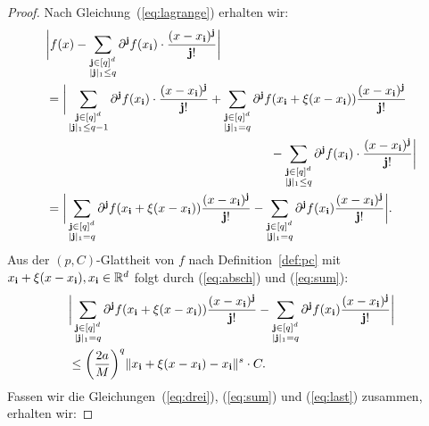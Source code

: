 \begin{proof}
Nach Gleichung~(\ref{eq:lagrange}) erhalten wir:
\begin{equation}
\label{eq:sum}
\begin{split}
& \bigg|f(x) - \sum_{\substack{\mathbf{j} \in [q]^d \\|\mathbf{j}|_1 \leq q}} \partial^{\mathbf{j}}f(x_{\mathbf{i}}) \cdot \frac{(x - x_{\mathbf{i}})^{\mathbf{j}}}{\mathbf{j}!}\bigg| \\ 
& = \bigg| \sum_{\substack{\mathbf{j} \in [q]^d \\ |\mathbf{j}|_1 \leq q - 1}}  \partial^{\mathbf{j}}f(x_{\mathbf{i}}) \cdot \frac{ (x - x_{\mathbf{i}})^{\mathbf{j}} }{\mathbf{j}!} + \sum_{\substack{ \mathbf{j} \in [q]^d \\|\mathbf{j}|_1 = q}} \partial^{\mathbf{j}}f(x_{\mathbf{i}} + \xi(x - x_{\mathbf{i}})) \frac{ (x - x_{\mathbf{i}})^{\mathbf{j}} }{\mathbf{j}!} \\
& \qquad \qquad \qquad \qquad \qquad \qquad \qquad \qquad \qquad - \sum_{\substack{\mathbf{j} \in [q]^d \\|\mathbf{j}|_1 \leq q}} \partial^{\mathbf{j}}f(x_{\mathbf{i}}) \cdot \frac{(x - x_{\mathbf{i}})^{\mathbf{j}}}{\mathbf{j}!}\bigg| \\
& = \bigg| \sum_{\substack{ \mathbf{j} \in [q]^d \\|\mathbf{j}|_1 = q}} \partial^{\mathbf{j}}f(x_{\mathbf{i}} + \xi(x - x_{\mathbf{i}})) \frac{ (x - x_{\mathbf{i}})^{\mathbf{j}} }{\mathbf{j}!} - \sum_{\substack{ \mathbf{j} \in [q]^d \\|\mathbf{j}|_1 = q}} \partial^{\mathbf{j}}f(x_{\mathbf{i}}) \frac{ (x - x_{\mathbf{i}})^{\mathbf{j}} }{\mathbf{j}!}\bigg|.
\end{split}
\end{equation}
Aus der $(p,C)$-Glattheit von $f$ nach Definition~\ref{def:pc} mit $x_{\mathbf{i}} + \xi(x - x_{\mathbf{i}}), x_{\mathbf{i}} \in \mathbb{R}^d$ folgt durch (\ref{eq:absch}) und (\ref{eq:sum}):
\begin{equation}
\label{eq:last}
\begin{split}
& \bigg| \sum_{\substack{ \mathbf{j} \in [q]^d \\|\mathbf{j}|_1 = q}} \partial^{\mathbf{j}}f(x_{\mathbf{i}} + \xi(x - x_{\mathbf{i}})) \frac{ (x - x_{\mathbf{i}})^{\mathbf{j}} }{\mathbf{j}!} - \sum_{\substack{ \mathbf{j} \in [q]^d \\|\mathbf{j}|_1 = q}} \partial^{\mathbf{j}}f(x_{\mathbf{i}}) \frac{ (x - x_{\mathbf{i}})^{\mathbf{j}} }{\mathbf{j}!}\bigg| \\
& \leq \bigg(\frac{2a}{M}\bigg)^q \|x_{\mathbf{i}} + \xi(x - x_{\mathbf{i}}) - x_{\mathbf{i}} \|^s \cdot C.
\end{split}
\end{equation}
Fassen wir die Gleichungen~(\ref{eq:drei}), (\ref{eq:sum}) und (\ref{eq:last}) zusammen, erhalten wir:

\end{proof}
